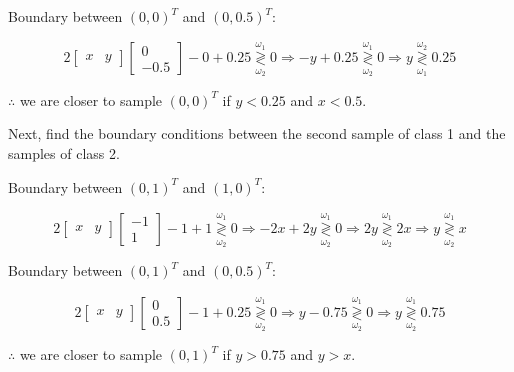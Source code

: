 \documentclass[fleqn]{article}
\begin{document}
\begin{enumerate}
		Boundary between $(0,0)^T$ and $(0,0.5)^T$:
		
		\begin{equation*}
			2 \begin{bmatrix} x & y \end{bmatrix} \begin{bmatrix}0\\ -0.5\end{bmatrix} - 0 + 0.25 \overset{\omega_1}{\underset{\omega_2}{\gtrless}} 0 \Rightarrow -y + 0.25 \overset{\omega_1}{\underset{\omega_2}{\gtrless}} 0 \Rightarrow y \overset{\omega_2}{\underset{\omega_1}{\gtrless}} 0.25		
		\end{equation*}
		
		$\therefore$ we are closer to sample $(0,0)^T$ if $y < 0.25$ and $x < 0.5$.
		
		Next, find the boundary conditions between the second sample of class 1 and the samples of class 2.
		
		Boundary between $(0,1)^T$ and $(1,0)^T$:
		
		\begin{equation*}
			2 \begin{bmatrix} x & y \end{bmatrix} \begin{bmatrix}-1\\ 1\end{bmatrix} - 1 + 1 \overset{\omega_1}{\underset{\omega_2}{\gtrless}} 0 \Rightarrow -2x + 2y \overset{\omega_1}{\underset{\omega_2}{\gtrless}} 0 \Rightarrow 2y \overset{\omega_1}{\underset{\omega_2}{\gtrless}} 2x \Rightarrow y \overset{\omega_1}{\underset{\omega_2}{\gtrless}} x		
		\end{equation*}
		
		Boundary between $(0,1)^T$ and $(0,0.5)^T$:
		
		\begin{equation*}
			2 \begin{bmatrix} x & y \end{bmatrix} \begin{bmatrix}0\\ 0.5\end{bmatrix} - 1 + 0.25 \overset{\omega_1}{\underset{\omega_2}{\gtrless}} 0 \Rightarrow y - 0.75 \overset{\omega_1}{\underset{\omega_2}{\gtrless}} 0 \Rightarrow y \overset{\omega_1}{\underset{\omega_2}{\gtrless}} 0.75		
		\end{equation*}
		
		$\therefore$ we are closer to sample $(0,1)^T$ if $y > 0.75$ and $y > x$.
		

\end{enumerate}
\end{document}
